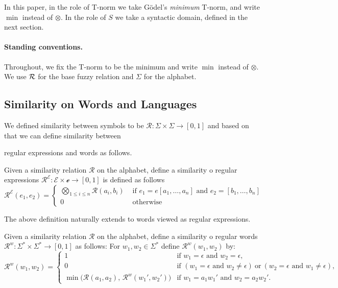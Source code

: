 In this paper, in the role of T-norm we take G\"odel's \emph{minimum} T-norm, and write $\min$ instead of $\otimes$. In the role of $S$ we take a syntactic domain, defined in the next section.

\paragraph{Standing conventions.}
Throughout, we fix the T-norm to be the minimum and write $\min$ instead of $\otimes$.
We use ${\mathcal R}$ for the base fuzzy relation and $\Sigma$ for the alphabet.



\subsection{Similarity on Words and Languages}
We defined similarity between symbols to be $\mathcal{R}:\Sigma \times \Sigma \rightarrow [0,1]$ and based on that we can define similarity between  {\color{red}  regular expressions and words as follows.
\begin{definition} Given a similarity relation $\mathcal R$ on the alphabet, define a similarity o regular expressions
 $\mathcal{R}^{\mathcal E}:\mathcal E \times \mathcal e \rightarrow [0,1]$ is defined as follows
$$\mathcal R^{\mathcal E}(e_1,e_2) =\begin{cases}\bigotimes_{1\leq i\leq n}\mathcal R(a_i,b_i) & \mbox{ if } e_1=e[a_1,\ldots,a_n] \mbox{ and }e_2 =[b_1,\ldots,b_n]\\
0& \mbox{  otherwise }
\end{cases}$$
\end{definition}
The  above definition naturally extends to words viewed as regular expressions.}


\begin{definition}\label{def:Rw}Given a similarity relation $\mathcal R$ on the alphabet, define a similarity o regular words $\mathcal{R}^w:\Sigma^* \times \Sigma^* \rightarrow [0,1]$ as follows:
For $w_1,w_2\in \Sigma^*$ define $\mathcal{R}^w(w_1,w_2)$ by:
\[
\mathcal{R}^w(w_1,w_2)=
\begin{cases}
1 & \text{if } w_1=\epsilon \text{ and } w_2=\epsilon,\\[2pt]
0 & \text{if } (w_1=\epsilon \text{ and } w_2\neq\epsilon)\ \text{or}\ (w_2=\epsilon \text{ and } w_1\neq\epsilon),\\[4pt]
\min\!\bigl(\mathcal{R}(a_1,a_2),\,\mathcal{R}^w(w_1',w_2')\bigr)
    & \text{if } w_1=a_1w_1' \text{ and } w_2=a_2w_2'.
\end{cases}
\]
\end{definition}

